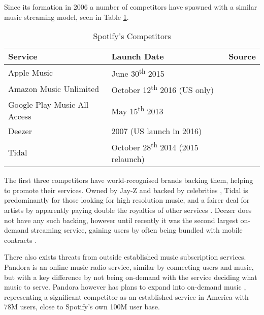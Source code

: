 Since its formation in 2006 a number of competitors have spawned with a similar music streaming model, seen in Table \ref{table:competitors}.
\begin{table}[ht!]
\centering
 \begin{tabular}{|l|l|l|} 
 \hline
 \textbf{Service} & \textbf{Launch Date} & \textbf{Source} \\ [0.2ex] 
 \hline
 \small{Apple Music} & \small{June 30\textsuperscript{th} 2015} & \small{\parencite{apple_music_launch}} \\ 
 \hline
 \small{Amazon Music Unlimited} & \small{October 12\textsuperscript{th} 2016 (US only)} & \small{\parencite{amazon_music_launch}} \\
 \hline
 \small{Google Play Music All Access} & \small{May 15\textsuperscript{th} 2013} & \small{\parencite{google_music_all_access_launch}} \\
 \hline
 \small{Deezer} & \small{2007 (US launch in 2016)} & \small{\parencite{deezer_launch, deezer_us_launch}} \\
 \hline
 \small{Tidal} & \small{October 28\textsuperscript{th} 2014 (2015 relaunch)} & \small{\parencite{tidal_launch}} \\
 \hline
 \end{tabular}
 \caption{Spotify's Competitors}
 \label{table:competitors}
\end{table}
\par
The first three competitors have world-recognised brands backing them, helping to promote their services. Owned by Jay-Z and backed by celebrities \parencite{tidal_launch_issues}, Tidal is predominantly for those looking for high resolution music, and a fairer deal for artists by apparently paying double the royalties of other services \parencite{tidal_launch_issues}. Deezer does not have any such backing, however until recently it was the second largest on-demand streaming service, gaining users by often being bundled with mobile contracts \parencite{music_streaming_guardian}.
\par
There also exists threats from outside established music subscription services. Pandora is an online music radio service, similar by connecting users and music, but with a key difference by not being on-demand with the service deciding what music to serve. Pandora however has plans to expand into on-demand music \parencite{pandora_subscription}, representing a significant competitor as an established service in America with 78M users, close to Spotify's own 100M user base.